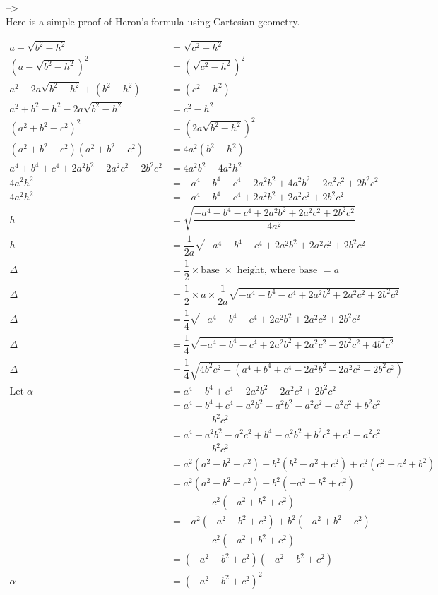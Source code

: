 \documentclass[
]{book}
\begin{document}
--\textgreater{}\\
Here is a simple proof of Heron's formula using Cartesian geometry.

\[
\begin{aligned}
a - \sqrt{b^2 - h^2} &= \sqrt{c^2 - h^2} \\
(a - \sqrt{b^2 - h^2})^2 &= (\sqrt{c^2 - h^2})^2 \\
a^2 - 2a\sqrt{b^2 - h^2} + (b^2 - h^2) &= (c^2 - h^2) \\
a^2 + b^2 - h^2 - 2a\sqrt{b^2 - h^2} &= c^2 - h^2 \\
(a^2 + b^2 - c^2)^2 &= (2a\sqrt{b^2 - h^2})^2 \\
(a^2 + b^2 - c^2)(a^2 + b^2 - c^2) &= 4a^2(b^2 - h^2) \\
a^4 + b^4 + c^4 + 2a^2b^2 - 2a^2c^2 - 2b^2c^2 &= 4a^2b^2 - 4a^2h^2 \\
4a^2h^2 &= -a^4 - b^4 - c^4 - 2a^2b^2 + 4a^2b^2 + 2a^2c^2 + 2b^2c^2 \\
4a^2h^2 &= -a^4 - b^4 - c^4 + 2a^2b^2 + 2a^2c^2 + 2b^2c^2 \\
h &= \sqrt{\dfrac{-a^4 - b^4 - c^4 + 2a^2b^2 + 2a^2c^2 + 2b^2c^2}{4a^2}} \\
h &= \dfrac{1}{2a} \sqrt{-a^4 - b^4 - c^4 + 2a^2b^2 + 2a^2c^2 + 2b^2c^2} \\
\Delta &= \dfrac{1}{2} \times \text{base $\times$ height, where base $= a$} \\
\Delta &= \dfrac{1}{2} \times a \times \dfrac{1}{2a} \sqrt{-a^4 - b^4 - c^4 + 2a^2b^2 + 2a^2c^2 + 2b^2c^2} \\
\Delta &= \dfrac{1}{4} \sqrt{-a^4 - b^4 - c^4 + 2a^2b^2 + 2a^2c^2 + 2b^2c^2} \\
\Delta &= \dfrac{1}{4} \sqrt{-a^4 - b^4 - c^4 + 2a^2b^2 + 2a^2c^2 - 2b^2c^2 + 4b^2c^2} \\
\Delta &= \dfrac{1}{4} \sqrt{4b^2c^2 - (a^4 + b^4 + c^4 - 2a^2b^2 - 2a^2c^2 + 2b^2c^2)} \\
\text{Let}\; \alpha &= a^4 + b^4 + c^4 - 2a^2b^2 - 2a^2c^2 + 2b^2c^2 \\
&= a^4 + b^4 + c^4 - a^2b^2 - a^2b^2 - a^2c^2 - a^2c^2 + b^2c^2 \\
    &\qquad\quad + b^2c^2 \\
&= a^4 - a^2b^2 - a^2c^2 + b^4 - a^2b^2 + b^2c^2 + c^4 - a^2c^2 \\
    &\qquad\quad + b^2c^2 \\
&= a^2(a^2 - b^2 - c^2) + b^2(b^2 - a^2 + c^2) + c^2(c^2 - a^2 + b^2) \\
&= a^2(a^2 - b^2 - c^2) + b^2(-a^2 + b^2 + c^2) \\
        &\qquad\quad + c^2(-a^2 + b^2 + c^2) \\
&= -a^2(-a^2 + b^2 + c^2) + b^2(-a^2 + b^2 + c^2) \\
        &\qquad\quad + c^2(-a^2 + b^2 + c^2) \\
&= (-a^2 + b^2 + c^2)(-a^2 + b^2 + c^2) \\
\alpha &= (-a^2 + b^2 + c^2)^2
\end{aligned}
\]
\end{document}
